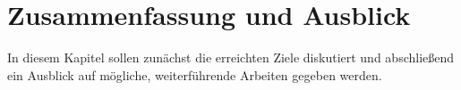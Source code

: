 \chapter{Zusammenfassung und Ausblick}
In diesem Kapitel sollen zunächst die erreichten Ziele diskutiert und abschließend ein Ausblick auf mögliche, weiterführende Arbeiten gegeben werden.
